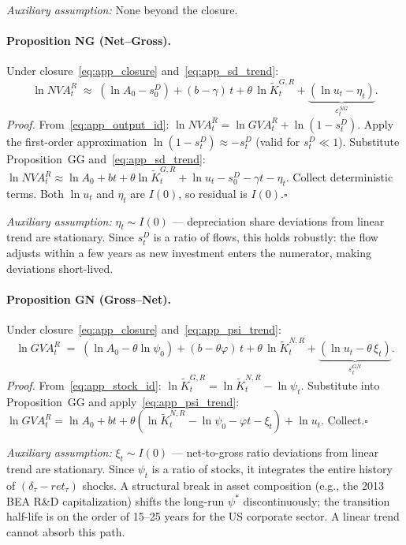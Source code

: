 \noindent\textit{Auxiliary assumption:} None beyond the closure.

\bigskip

\paragraph{Proposition NG (Net--Gross).}
Under closure~\eqref{eq:app_closure} and~\eqref{eq:app_sd_trend}:
%
\begin{equation}
  \label{eq:app_NG}
  \ln NVA_t^R
  \;\approx\; (\ln A_0 - s_0^D) + (b - \gamma)\,t
  + \theta\,\ln\tilde{K}_t^{G,R}
  + \underbrace{(\ln u_t - \eta_t)}_{\varepsilon_t^{NG}}.
\end{equation}
%
\emph{Proof.} From~\eqref{eq:app_output_id}:
$\ln NVA_t^R = \ln GVA_t^R + \ln(1-s_t^D)$.
Apply the first-order approximation $\ln(1-s_t^D) \approx -s_t^D$
(valid for $s_t^D \ll 1$). Substitute Proposition~GG and~\eqref{eq:app_sd_trend}:
$\ln NVA_t^R \approx \ln A_0 + bt + \theta\ln\tilde{K}_t^{G,R} + \ln u_t
- s_0^D - \gamma t - \eta_t$.
Collect deterministic terms. Both $\ln u_t$ and $\eta_t$ are $I(0)$, so
residual is $I(0)$.\hfill$\square$

\noindent\textit{Auxiliary assumption:} $\eta_t \sim I(0)$ — depreciation
share deviations from linear trend are stationary. Since $s_t^D$ is a
ratio of flows, this holds robustly: the flow adjusts within a few years
as new investment enters the numerator, making deviations short-lived.

\bigskip

\paragraph{Proposition GN (Gross--Net).}
Under closure~\eqref{eq:app_closure} and~\eqref{eq:app_psi_trend}:
%
\begin{equation}
  \label{eq:app_GN}
  \ln GVA_t^R
  \;=\; (\ln A_0 - \theta\ln\psi_0) + (b - \theta\varphi)\,t
  + \theta\,\ln\tilde{K}_t^{N,R}
  + \underbrace{(\ln u_t - \theta\,\xi_t)}_{\varepsilon_t^{GN}}.
\end{equation}
%
\emph{Proof.} From~\eqref{eq:app_stock_id}:
$\ln\tilde{K}_t^{G,R} = \ln\tilde{K}_t^{N,R} - \ln\psi_t$.
Substitute into Proposition~GG and apply~\eqref{eq:app_psi_trend}:
$\ln GVA_t^R = \ln A_0 + bt + \theta(\ln\tilde{K}_t^{N,R} - \ln\psi_0 -
\varphi t - \xi_t) + \ln u_t$.
Collect.\hfill$\square$

\noindent\textit{Auxiliary assumption:} $\xi_t \sim I(0)$ — net-to-gross
ratio deviations from linear trend are stationary. Since $\psi_t$ is a
ratio of stocks, it integrates the entire history of
$(\delta_\tau - ret_\tau)$ shocks. A structural break in asset composition
(e.g., the 2013 BEA R\&D capitalization) shifts the long-run $\psi^*$
discontinuously; the transition half-life is on the order of 15--25 years
for the US corporate sector. A linear trend cannot absorb this path.

